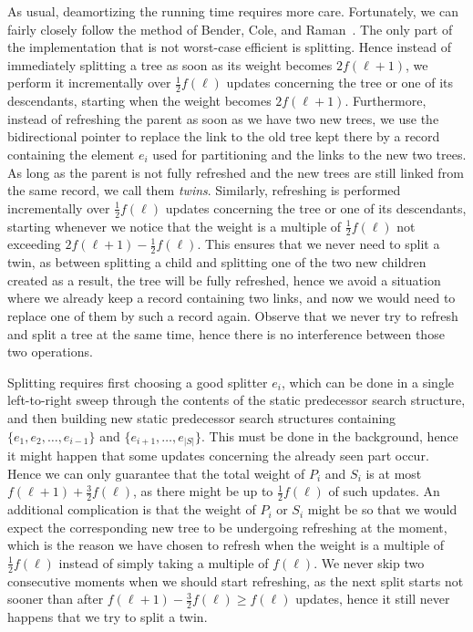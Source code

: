 \documentclass[11pt,onecolumn,final]{article} \usepackage{a4}
\theoremstyle{plain}
\theoremstyle{remark}
\begin{document}
As usual, deamortizing the running time requires more care. Fortunately, we can fairly closely follow the method of Bender, Cole, and Raman~\cite{bender02exponential}.  The only part of the implementation that is not worst-case efficient is splitting. Hence instead of immediately splitting a tree as soon as its weight becomes $2f(\ell+1)$, we perform it incrementally over $\frac{1}{2}f(\ell)$ updates concerning the tree or one of its descendants, starting when the weight becomes $2f(\ell+1)$.
Furthermore, instead of refreshing the parent as soon as we have two new trees, we use the bidirectional pointer to replace the link to the old tree kept there by a record containing the element $e_{i}$ used for partitioning and the links to the new two trees. As long as the parent is not fully refreshed and the new trees are still linked from the same record, we call them \emph{twins}.
Similarly, refreshing is performed incrementally over $\frac{1}{2}f(\ell)$ updates concerning the tree or one of its descendants, starting whenever we notice that the weight is a multiple of $\frac{1}{2}f(\ell)$ not exceeding $2f(\ell+1)-\frac{1}{2}f(\ell)$. This ensures that we never need to split a twin, as between splitting a child and splitting one of the two new children created as a result, the tree will be fully refreshed, hence we avoid a situation where we already keep a record containing two links, and now we would need to replace one of them by such a record again. Observe that we never try to refresh and split a tree at the same time, hence there is no interference between those two operations.

Splitting requires first choosing a good splitter $e_{i}$, which can be done in a single left-to-right sweep through the contents of the static predecessor search structure, and then building new static predecessor search structures containing $\{e_{1},e_{2},\ldots,e_{i-1}\}$ and $\{e_{i+1},\ldots,e_{|S|}\}$. This must be done in the background, hence it might happen that some updates concerning the already seen part occur. Hence we can only guarantee that the total weight of $P_{i}$ and $S_{i}$ is at most $f(\ell+1)+\frac{3}{2}f(\ell)$, as there might be up to $\frac{1}{2}f(\ell)$ of such updates. An additional complication is that the weight of $P_{i}$ or $S_{i}$ might be so that we would expect the corresponding new tree to be undergoing refreshing at the moment, which is the reason we have chosen to refresh when the weight is a multiple of $\frac{1}{2}f(\ell)$ instead of simply taking a multiple of $f(\ell)$. We never skip two consecutive moments when we should start refreshing, as the next split starts not sooner than after $f(\ell+1)-\frac{3}{2}f(\ell)\geq f(\ell)$ updates, hence it still never happens that we try to split a twin.
\end{document}
